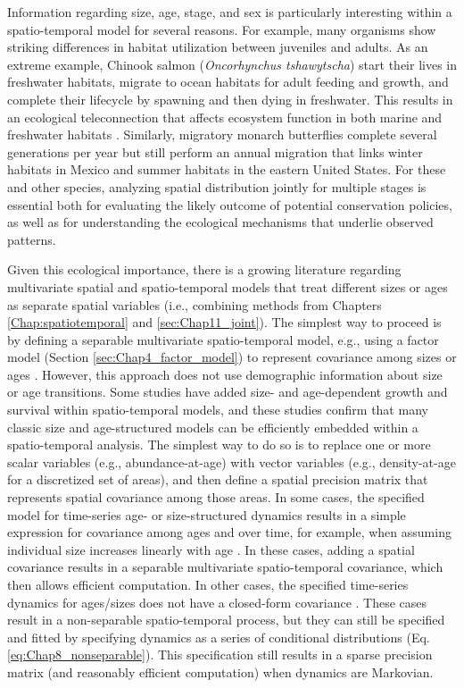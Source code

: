 Information regarding size, age, stage, and sex is particularly interesting within a spatio-temporal model for several reasons.  For example, many organisms show striking differences in habitat utilization between juveniles and adults.  As an extreme example, Chinook salmon (\textit{Oncorhynchus tshawytscha}) start their lives in freshwater habitats, migrate to ocean habitats for adult feeding and growth, and complete their lifecycle by spawning and then dying in freshwater.  This results in an ecological teleconnection that affects ecosystem function in both marine and freshwater habitats \cite{armstrong_resource_2016,springer_transhemispheric_2018}.  Similarly, migratory monarch butterflies complete several generations per year but still perform an annual migration that links winter habitats in Mexico and summer habitats in the eastern United States.  For these and other species, analyzing spatial distribution jointly for multiple stages is essential both for evaluating the likely outcome of potential conservation policies, as well as for understanding the ecological mechanisms that underlie observed patterns.   

Given this ecological importance, there is a growing literature regarding multivariate spatial and spatio-temporal models that treat different sizes or ages as separate spatial variables (i.e., combining methods from Chapters \ref{Chap:spatiotemporal} and \ref{sec:Chap11_joint}). The simplest way to proceed is by defining a separable multivariate spatio-temporal model, e.g., using a factor model (Section \ref{sec:Chap4_factor_model}) to represent covariance among sizes or ages \cite{kai_predicting_2017}. However, this approach does not use demographic information about size or age transitions.  Some studies have added size- and age-dependent growth and survival within spatio-temporal models, and these studies confirm that many classic size and age-structured models can be efficiently embedded within a spatio-temporal analysis.  The simplest way to do so is to replace one or more scalar variables (e.g., abundance-at-age) with vector variables (e.g., density-at-age for a discretized set of areas), and then define a spatial precision matrix that represents spatial covariance among those areas.  In some cases, the specified model for time-series age- or size-structured dynamics results in a simple expression for covariance among ages and over time, for example, when assuming individual size increases linearly with age \cite{kristensen_estimating_2014}.  In these cases, adding a spatial covariance results in a separable multivariate spatio-temporal covariance, which then allows efficient computation.  In other cases, the specified time-series dynamics for ages/sizes does not have a closed-form covariance \cite{thorson_spatial_2015}.  These cases result in a non-separable spatio-temporal process, but they can still be specified and fitted by specifying dynamics as a series of conditional distributions (Eq. \ref{eq:Chap8_nonseparable}). This specification still results in a sparse precision matrix (and reasonably efficient computation) when dynamics are Markovian.      

